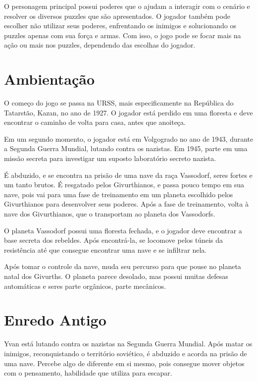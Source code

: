 \documentclass[12pt, a4paper]{article}
\begin{document}
    O personagem principal possui poderes que o ajudam
    a interagir com o cenário e resolver os diversos puzzles que são apresentados.
    O jogador também pode escolher não utilizar seus poderes, enfrentando os inimigos
    e solucionando os puzzles apenas com sua força e armas. Com isso, o jogo pode se
    focar mais na ação ou mais nos puzzles, dependendo das escolhas do jogador.

\section{Ambientação}
    O começo do jogo se passa na URSS, mais especificamente na República do Tatarstão, Kazan,
    no ano de 1927. O jogador está perdido em uma floresta e deve encontrar o caminho
    de volta para casa, antes que anoiteça.

    Em um segundo momento, o jogador está em Volgogrado no ano de 1943, durante a Segunda
    Guerra Mundial, lutando contra os nazistas. Em 1945, parte em uma missão secreta
    para investigar um suposto laboratório secreto nazista.

    É abduzido, e se encontra na prisão de uma nave da raça Vassodorf, seres fortes e
    um tanto brutos. É resgatado pelos Givurthianos, e passa pouco tempo em sua nave, 
    pois vai para uma fase de treinamento em um planeta escolhido pelos Givurthianos
    para desenvolver seus poderes. Após a fase de treinamento, volta à nave dos 
    Givurthianos, que o transportam ao planeta dos Vassodorfs.

    O planeta Vassodorf possui uma floresta fechada, e o jogador deve encontrar a
    base secreta dos rebeldes. Após encontrá-la, se locomove pelos túneis da resistência
    até que consegue encontrar uma nave e se infiltrar nela.

    Após tomar o controle da nave, muda seu percurso para que pouse no planeta natal
    dos Givurths. O planeta parece desolado, mas possui muitas defesas automáticas
    e seres parte orgânicos, parte mecânicos.

\section{Enredo Antigo}
    Yvan está lutando contra os nazistas na Segunda Guerra Mundial. Após matar
    os inimigos, reconquistando o território soviético, é abduzido e acorda
    na prisão de uma nave. Percebe algo de diferente em si mesmo, pois consegue
    mover objetos com o pensamento, habilidade que utiliza para escapar.
\end{document}
